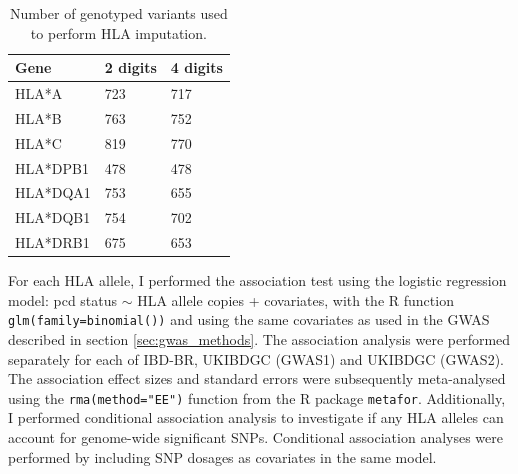 \begin{table}[H]
  \centering
  \caption{Number of genotyped variants used to perform HLA imputation.}
  \label{table:hla_allele_num}
  \begin{tabular}{|l|l|l|}
  \hline
  Gene     & 2 digits & 4 digits \\ \hline
  HLA*A    & 723      & 717      \\ \hline
  HLA*B    & 763      & 752      \\ \hline
  HLA*C    & 819      & 770      \\ \hline
  HLA*DPB1 & 478      & 478      \\ \hline
  HLA*DQA1 & 753      & 655      \\ \hline
  HLA*DQB1 & 754      & 702      \\ \hline
  HLA*DRB1 & 675      & 653      \\ \hline
  \end{tabular}
  \end{table}
For each HLA allele, I performed the association test using the logistic regression model: pcd status $\sim$ HLA allele copies + covariates, with the R function \Verb+glm(family=binomial())+ and using the same covariates as used in the GWAS described in section \ref{sec:gwas_methods}. The association analysis were performed separately for each of IBD-BR, UKIBDGC (GWAS1) and UKIBDGC (GWAS2). The association effect sizes and standard errors were subsequently meta-analysed using the \Verb+rma(method="EE")+ function from the R package \Verb+metafor+. Additionally, I performed conditional association analysis to investigate if any HLA alleles can account for genome-wide significant SNPs. Conditional association analyses were performed by including SNP dosages as covariates in the same model. 



